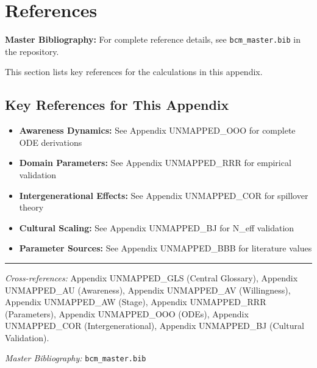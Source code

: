 \section{References}

\nocite{bcm_master}

\label{sec:calc-references}

\begin{tcolorbox}[colback=blue!5!white, colframe=blue!75!black]
\textbf{Master Bibliography:} For complete reference details, see
\texttt{bcm\_master.bib} in the repository.

This section lists key references for the calculations in this appendix.
\end{tcolorbox}

\subsection{Key References for This Appendix}

\begin{itemize}[nosep]
    \item \textbf{Awareness Dynamics:} See Appendix UNMAPPED_OOO for complete ODE derivations
    \item \textbf{Domain Parameters:} See Appendix UNMAPPED_RRR for empirical validation
    \item \textbf{Intergenerational Effects:} See Appendix UNMAPPED_COR for spillover theory
    \item \textbf{Cultural Scaling:} See Appendix UNMAPPED_BJ for N\_eff validation
    \item \textbf{Parameter Sources:} See Appendix UNMAPPED_BBB for literature values
\end{itemize}



\vspace{1em}
\hrule
\vspace{0.5em}

\noindent\textit{Cross-references:}
Appendix UNMAPPED_GLS (Central Glossary),
Appendix UNMAPPED_AU (Awareness),
Appendix UNMAPPED_AV (Willingness),
Appendix UNMAPPED_AW (Stage),
Appendix UNMAPPED_RRR (Parameters),
Appendix UNMAPPED_OOO (ODEs),
Appendix UNMAPPED_COR (Intergenerational),
Appendix UNMAPPED_BJ (Cultural Validation).

\noindent\textit{Master Bibliography:} \texttt{bcm\_master.bib}



